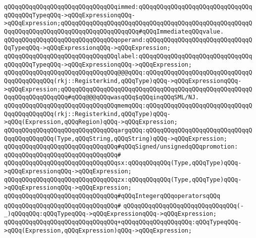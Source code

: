 \newline
\verb|qQQqqQQqqQQqqQQqqQQqqQQqqQQqqQQqimmed:qQQqqQQqqQQqqQQqqQQqqQQqqQQqqQQqqQQqqQQqTypeqQQq->qQQqExpressionqQQq->qQQqExpression;qQQqqQQqqQQqqQQqqQQqqQQqqQQqqQQqqQQqqQQqqQQqqQQqqQQqqQQqqQQqqQQqqQQqqQQqqQQqqQQqqQQqqQQqqQQq#qQQqImmediateqQQqvalue.|\newline
\verb|qQQqqQQqqQQqqQQqqQQqqQQqqQQqqQQqoperand:qQQqqQQqqQQqqQQqqQQqqQQqqQQqqQQqTypeqQQq->qQQqExpressionqQQq->qQQqExpression;|\newline
\verb|qQQqqQQqqQQqqQQqqQQqqQQqqQQqqQQqlabel:qQQqqQQqqQQqqQQqqQQqqQQqqQQqqQQqqQQqqQQqTypeqQQq->qQQqExpressionqQQq->qQQqExpression;|\newline
\newline
\verb|qQQqqQQqqQQqqQQqqQQqqQQqqQQqqQQq@@@qQQq:qQQqqQQqqQQqqQQqqQQqqQQqqQQqqQQqqQQqqQQqqQQq(rkj::Registerkind,qQQqType)qQQq->qQQqExpressionqQQq->qQQqExpression;qQQqqQQqqQQqqQQqqQQqqQQqqQQqqQQqqQQqqQQqqQQqqQQqqQQqqQQqqQQqqQQqqQQqqQQq#qQQq@@@qQQqwasqQQq$qQQqinqQQqSML/NJ.|\newline
\verb|qQQqqQQqqQQqqQQqqQQqqQQqqQQqqQQqmemqQQq:qQQqqQQqqQQqqQQqqQQqqQQqqQQqqQQqqQQqqQQqqQQq(rkj::Registerkind,qQQqType)qQQq->qQQq(Expression,qQQqRegion)qQQq->qQQqExpression;|\newline
\verb|qQQqqQQqqQQqqQQqqQQqqQQqqQQqqQQqargqQQq:qQQqqQQqqQQqqQQqqQQqqQQqqQQqqQQqqQQqqQQqqQQq(Type,qQQqString,qQQqString)qQQq->qQQqExpression;|\newline
\newline
\verb|qQQqqQQqqQQqqQQqqQQqqQQqqQQqqQQq#qQQqSigned/unsignedqQQqpromotion:|\newline
\verb|qQQqqQQqqQQqqQQqqQQqqQQqqQQqqQQq#|\newline
\verb|qQQqqQQqqQQqqQQqqQQqqQQqqQQqqQQqsx:qQQqqQQqqQQq(Type,qQQqType)qQQq->qQQqExpressionqQQq->qQQqExpression;|\newline
\verb|qQQqqQQqqQQqqQQqqQQqqQQqqQQqqQQqzx:qQQqqQQqqQQq(Type,qQQqType)qQQq->qQQqExpressionqQQq->qQQqExpression;|\newline
\newline
\verb|qQQqqQQqqQQqqQQqqQQqqQQqqQQqqQQq#qQQqIntegerqQQqoperatorsqQQq|\newline
\verb|qQQqqQQqqQQqqQQqqQQqqQQqqQQqqQQq#|\newline
\verb|qQQqqQQqqQQqqQQqqQQqqQQqqQQqqQQq(-_)qQQqqQQq:qQQqTypeqQQq->qQQqExpressionqQQq->qQQqExpression;|\newline
\verb|qQQqqQQqqQQqqQQqqQQqqQQqqQQqqQQq+qQQqqQQqqQQqqQQqqQQq:qQQqTypeqQQq->qQQq(Expression,qQQqExpression)qQQq->qQQqExpression;|\newline
